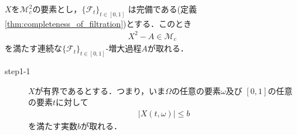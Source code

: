 	\begin{screen}
		\begin{thm}[二乗可積分マルチンゲールの分解]
		\label{thm:decomposition_of_square_integrable_martingales}
			$X$を$\mathscr{M}_{c}^{2}$の要素とし，$\{\mathscr{F}_t\}_{t \in [0,1]}$
			は完備である(定義\ref{thm:completeness_of_filtration})とする．このとき
			\begin{align}
				X^2 - A \in \mathscr{M}_{c}
			\end{align}
			を満たす連続な$\{\mathscr{F}_t\}_{t \in [0,1]}$-増大過程$A$が取れる．
		\end{thm}
	\end{screen}
	
	\begin{sketch}\mbox{}
		\begin{description}
			\item[step1-1] $X$が有界であるとする．つまり，いま$\Omega$の任意の要素$\omega$及び
				$[0,1]$の任意の要素$t$に対して
				\begin{align}
					|X(t,\omega)| \leq b
				\end{align}
				を満たす実数$b$が取れる．
			

\end{description}
\end{sketch}
